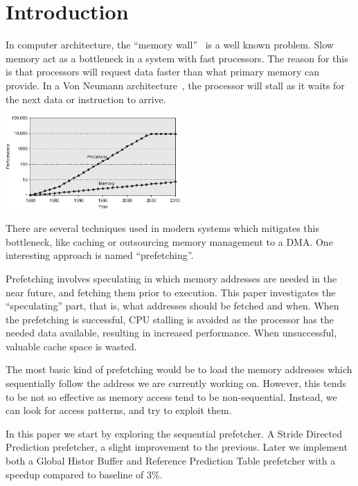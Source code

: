 \section{Introduction} %


In computer architecture, the ``memory wall''~\cite{wulf_mckee_1995}
is a well known problem. Slow memory act as a bottleneck in a system
with fast processors. The reason for this is that processors will
request data faster than what primary memory can provide. In a Von
Neumann architecture~\cite{von1992first}, the processor
will stall as it waits for the next data or instruction to arrive.

\begin{center}
  \includegraphics[width=0.5\textwidth]{graphs/memorywall}
\end{center}

There are several techniques used in modern systems which mitigates
this bottleneck, like caching or outsourcing memory management to a
DMA. One interesting approach is named ``prefetching''.

Prefetching involves speculating in which memory addresses are needed
in the near future, and fetching them prior to execution. This paper
investigates the ``speculating'' part, that is, what addresses should
be fetched and when. When the prefetching is successful, CPU stalling
is avoided as the processor has the needed data available, resulting
in increased performance. When unsuccessful, valuable cache space is
wasted.

The most basic kind of prefetching would be to load the memory
addresses which sequentially follow the address we are currently
working on. However, this tends to be not so effective as memory
access tend to be non-sequential. Instead, we can look for access
patterns, and try to exploit them.

In this paper we start by exploring the sequential prefetcher. A
Stride Directed Prediction prefetcher, a slight improvement to the
previous. Later
we implement both a Global Histor Buffer and Reference Prediction
Table prefetcher with a speedup compared to baseline of 3\%. 


